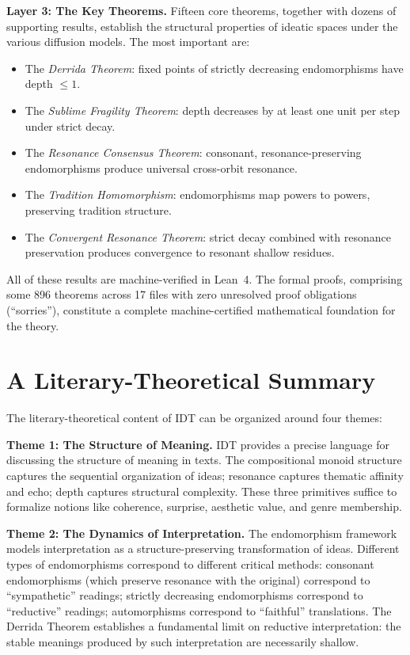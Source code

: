 \documentclass[11pt,openany]{book}
\theoremstyle{definition}
\theoremstyle{plain}
\theoremstyle{remark}
\begin{document}
\textbf{Layer 3: The Key Theorems.} Fifteen core theorems, together with dozens of supporting results, establish the structural properties of ideatic spaces under the various diffusion models. The most important are:
\begin{itemize}
\item The \emph{Derrida Theorem}: fixed points of strictly decreasing endomorphisms have depth $\leq 1$.
\item The \emph{Sublime Fragility Theorem}: depth decreases by at least one unit per step under strict decay.
\item The \emph{Resonance Consensus Theorem}: consonant, resonance-preserving endomorphisms produce universal cross-orbit resonance.
\item The \emph{Tradition Homomorphism}: endomorphisms map powers to powers, preserving tradition structure.
\item The \emph{Convergent Resonance Theorem}: strict decay combined with resonance preservation produces convergence to resonant shallow residues.
\end{itemize}

All of these results are machine-verified in Lean~4. The formal proofs, comprising some 896 theorems across 17 files with zero unresolved proof obligations (``sorries''), constitute a complete machine-certified mathematical foundation for the theory.

\section*{A Literary-Theoretical Summary}

The literary-theoretical content of IDT can be organized around four themes:

\textbf{Theme 1: The Structure of Meaning.} IDT provides a precise language for discussing the structure of meaning in texts. The compositional monoid structure captures the sequential organization of ideas; resonance captures thematic affinity and echo; depth captures structural complexity. These three primitives suffice to formalize notions like coherence, surprise, aesthetic value, and genre membership.

\textbf{Theme 2: The Dynamics of Interpretation.} The endomorphism framework models interpretation as a structure-preserving transformation of ideas. Different types of endomorphisms correspond to different critical methods: consonant endomorphisms (which preserve resonance with the original) correspond to ``sympathetic'' readings; strictly decreasing endomorphisms correspond to ``reductive'' readings; automorphisms correspond to ``faithful'' translations. The Derrida Theorem establishes a fundamental limit on reductive interpretation: the stable meanings produced by such interpretation are necessarily shallow.
\end{document}
